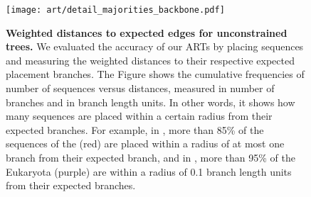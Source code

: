 
\begin{figure}[hpbt]
    \centering
    \texttt{[image: art/detail\_majorities\_backbone.pdf]}
    \begin{subfigure}{0pt}
        \label{fig:detail_majorities_backbone:sub:num_br}
    \end{subfigure}
    \begin{subfigure}{0pt}
        \label{fig:detail_majorities_backbone:sub:br_dist}
    \end{subfigure}
    \caption[Weighted distances to expected edges for unconstrained trees]{
        \textbf{Weighted distances to expected edges for unconstrained trees.}
        We evaluated the accuracy of our \acp{ART} by placing sequences
        and measuring the weighted distances to their respective expected placement branches.
        The Figure shows the cumulative frequencies of number of sequences versus distances,
        measured  in number of branches
        and  in branch length units.
        In other words, it shows how many sequences are placed
        within a certain radius from their expected branches.
        For example, in ,
        more than 85\% of the sequences of the  (red) are placed
        within a radius of at most one branch from their expected branch,
        and in , more than 95\% of the Eukaryota (purple) are
        within a radius of 0.1 branch length units from their expected branches.
    }
    \label{fig:detail_majorities_backbone}
\end{figure}


